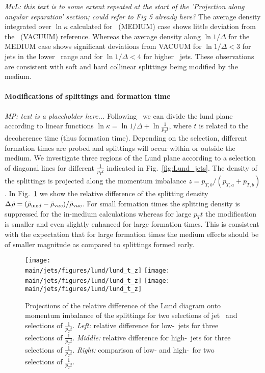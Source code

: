\textit{MvL: this text is to some extent repeated at the start of the 'Projection along angular separation' section; could refer to Fig 5 already here?}
The average density integrated over $\ln \kappa$ calculated for \PbPb\ (MEDIUM) case shows little deviation from the \pp\ (VACUUM) reference.
Whereas the average density along $\ln 1/\Delta$ for the MEDIUM case shows significant deviations from VACUUM for $\ln 1/\Delta < 3$ for jets in the lower \pt\ range and for $\ln 1/\Delta < 4$ for higher \pt\ jets.
These observations are consistent with soft and hard collinear splittings being modified by the medium.

\paragraph{Modifications of splittings and formation time}

{\it MP: text is a placeholder here...}
Following~\cite{Andrews:2018jcm} we can divide the lund plane according to linear functions $\ln\kappa = \ln1/\Delta + \ln \frac{1}{p_{T} t}$, where $t$ is related to the decoherence time (thus formation time).
Depending on the selection, different formation times are probed and splittings will occur within or outside the medium.
We investigate three regions of the Lund plane according to a selection of diagonal lines for different $\frac{1}{p_{T} t}$ indicated in Fig.~\ref{fig:Lund_jets}.
The density of the splittings is projected along the momentum imbalance $z = p_{T,b}/(p_{T,a} + p_{T,b})$.
In Fig.~\ref{fig:Lund_projections_z} we show the relative difference of the splitting density $\Delta_{\rm}\bar{\rho} = (\bar{\rho}_{\mathrm med} - \bar{\rho}_{\mathrm vac})/\bar{\rho}_{\mathrm vac}$.
For small formation times the splitting density is suppressed for the in-medium calculations whereas for large $p_{T} t$ the modification is smaller and even slightly enhanced for large formation times.
This is consistent with the expectation that for large formation times the medium effects should be of smaller magnitude as compared to splittings formed early.



\begin{figure}[htbp]
	\centering
	\texttt{[image: \\main/jets/figures/lund/lund\_t\_z]}
	\texttt{[image: \\main/jets/figures/lund/lund\_t\_z]}
	\texttt{[image: \\main/jets/figures/lund/lund\_t\_z]}
	\caption{Projections of the relative difference of the Lund diagram onto momentum imbalance of the splittings for two selections of jet \pt\ and selections of $\frac{1}{p_{T} t}$.
	{\it Left:} relative difference for low-\pt\ jets for three selections of $\frac{1}{p_{T} t}$.
	{\it Middle:} relative difference for high-\pt\ jets for three selections of $\frac{1}{p_{T} t}$.
	{\it Right:} comparison of low- and high-\pt\ for two selections of $\frac{1}{p_{T} t}$.
	}
	\label{fig:Lund_projections_z}
\end{figure}

